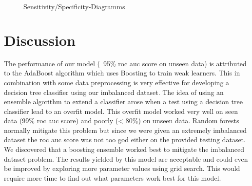 \documentclass[a4, 10 pt, conference]{ieeeconf}  %
\begin{document}
{\begin{figure}[h]
\centering
  \caption{ Sensitivity/Specificity-Diagramms}
 \end{figure} 
}

\section{Discussion}
\label{sec:discuss}

{\color{blue}
\begin{itemize}
	\textbfn 
	The performance of our model (~95\% roc auc score on unseen data) is attributed to the AdaBoost algorithm which uses Boosting to train 	weak learners. This in combination with some data preprocessing is very effective for developing a decision tree classifier using our 			imbalanced dataset. 
	The idea of using an ensemble algorithm to extend a classifier arose when a test using a decision tree classifier lead to an overfit model. 		This overfit model worked very well on seen data (99\% roc auc score) and poorly (< 80\%) on unseen data. Random forests normally 		mitigate this problem but since we were given an extremely imbalanced dataset the roc auc score was not too god either on the provided 		testing dataset. We discovered that a boosting ensemble worked best to mitigate the imbalanced dataset problem.			The results 	yielded by this model are acceptable and could even be improved by exploring more parameter values using grid search. This would require 	more time to find out what parameters work best for this model.


\end{itemize}
}
\end{document}
